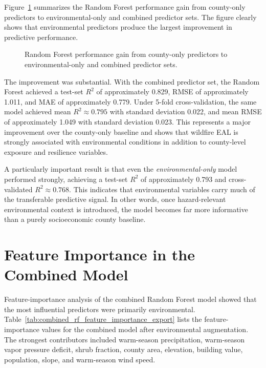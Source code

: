 Figure~\ref{fig:environmental_performance_gain} summarizes the Random Forest performance gain from county-only predictors to environmental-only and combined predictor sets. The figure clearly shows that environmental predictors produce the largest improvement in predictive performance.

\begin{figure}[htbp]
    \centering
    \caption{Random Forest performance gain from county-only predictors to environmental-only and combined predictor sets.}
    \label{fig:environmental_performance_gain}
\end{figure}

The improvement was substantial. With the combined predictor set, the Random Forest achieved a test-set $R^2$ of approximately 0.829, RMSE of approximately 1.011, and MAE of approximately 0.779. Under 5-fold cross-validation, the same model achieved mean $R^2 \approx 0.795$ with standard deviation 0.022, and mean RMSE of approximately 1.049 with standard deviation 0.023. This represents a major improvement over the county-only baseline and shows that wildfire EAL is strongly associated with environmental conditions in addition to county-level exposure and resilience variables.

A particularly important result is that even the \emph{environmental-only} model performed strongly, achieving a test-set $R^2$ of approximately 0.793 and cross-validated $R^2 \approx 0.768$. This indicates that environmental variables carry much of the transferable predictive signal. In other words, once hazard-relevant environmental context is introduced, the model becomes far more informative than a purely socioeconomic county baseline.

\section{Feature Importance in the Combined Model}

Feature-importance analysis of the combined Random Forest model showed that the most influential predictors were primarily environmental. Table~\ref{tab:combined_rf_feature_importance_export} lists the feature-importance values for the combined model after environmental augmentation. The strongest contributors included warm-season precipitation, warm-season vapor pressure deficit, shrub fraction, county area, elevation, building value, population, slope, and warm-season wind speed.

